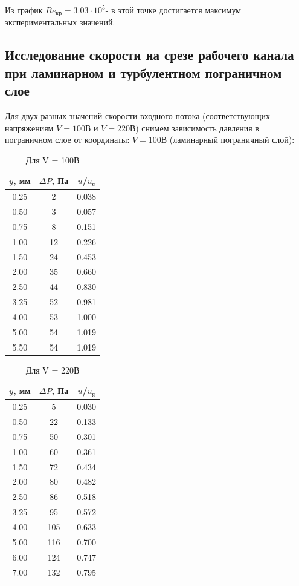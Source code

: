 \documentclass[a4paper]{article}
\begin{document}
Из график $Re_\text{кр} = 3.03 \cdot 10^5$- в этой точке достигается максимум экспериментальных значений.


\subsection*{Исследование скорости на срезе рабочего канала при ламинарном и турбулентном пограничном слое}

Для двух разных значений скорости входного потока (соответствующих напряжениям $V = 100$В и $V = 220$В) снимем зависимость давления в пограничном слое от координаты: $V = 100$В (ламинарный пограничный слой):

\begin{table}[H]
\centering
\begin{tabular}{|c|c|c|}
\hline
 $y$, мм & $\Delta P$, Па & $u$/$u_\text{я}$ \\ \hline
0.25 & 2 & 0.038  \\ \hline
0.50 & 3 & 0.057  \\ \hline
0.75 & 8 & 0.151  \\ \hline
1.00 & 12 & 0.226  \\ \hline
1.50 & 24 & 0.453  \\ \hline
2.00 & 35 & 0.660  \\ \hline
2.50 & 44 & 0.830  \\ \hline
3.25 & 52 & 0.981  \\ \hline
4.00 & 53 & 1.000  \\ \hline
5.00 & 54 & 1.019  \\ \hline
5.50 & 54 & 1.019  \\ \hline

\end{tabular}
\caption{Для V = 100В}
\end{table}




\begin{table}[H]
\centering
\begin{tabular}{|c|c|c|}
\hline
 $y$, мм & $\Delta P$, Па & $u$/$u_\text{я}$ \\ \hline
0.25 & 5 & 0.030  \\ \hline
0.50 & 22 & 0.133 \\ \hline
0.75 & 50 & 0.301  \\ \hline
1.00 & 60 & 0.361  \\ \hline
1.50 & 72 & 0.434  \\ \hline
2.00 & 80 & 0.482  \\ \hline
2.50 & 86 & 0.518  \\ \hline
3.25 & 95 & 0.572  \\ \hline
4.00 & 105 & 0.633  \\ \hline
5.00 & 116 & 0.700  \\ \hline
6.00 & 124 & 0.747  \\ \hline
7.00 & 132 & 0.795  \\ \hline

\end{tabular}
\caption{Для V = 220В}
\end{table}
\end{document}
